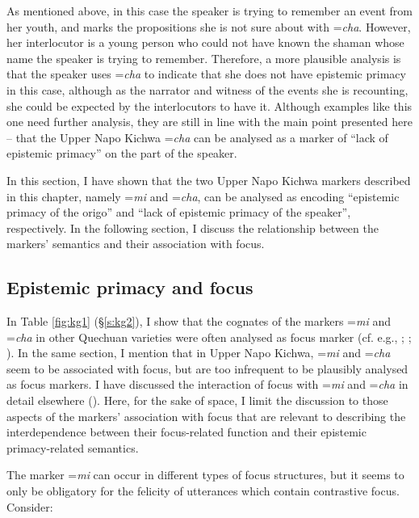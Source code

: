 \documentclass[output=paper]{langscibook}
\begin{document}
As mentioned above, in this case the speaker is trying to remember an event from her youth, and marks the propositions she is not sure about with =\textit{cha}. However, her interlocutor is a young person who could not have known the shaman whose name the speaker is trying to remember. Therefore, a more plausible analysis is that the speaker uses =\textit{cha} to indicate that she does not have epistemic primacy in this case, although as the narrator and witness of the events she is recounting, she could be expected by the interlocutors to have it. Although examples like this one need further analysis, they are still in line with the main point presented here – that the Upper Napo Kichwa =\textit{cha} can be analysed as a marker of “lack of epistemic primacy” on the part of the speaker.

In this section, I have shown that the two Upper Napo Kichwa markers described in this chapter, namely =\textit{mi} and =\textit{cha}, can be analysed as encoding “epistemic primacy of the origo” and “lack of epistemic primacy of the speaker”, respectively. In the following section, I discuss the relationship between the markers’ semantics and their association with focus. 


\subsection{Epistemic primacy and focus}\label{s:kg4-2}

In Table \ref{fig:kg1} (§\ref{s:kg2}), I show that the cognates of the markers =\textit{mi} and =\textit{cha} in other Quechuan  varieties were often analysed as focus marker (cf. e.g., \citealt{Muysken1995}; \citealt{Sanchez2010}; \citeyear{Sanchez2015}). In the same section, I mention that in Upper Napo Kichwa, =\textit{mi} and =\textit{cha} seem to be associated with focus, but are too infrequent to be plausibly analysed as focus markers. I have discussed the interaction of focus with =\textit{mi} and =\textit{cha} in detail elsewhere (\citealt[ch.4]{Grzech2016}). Here, for the sake of space, I limit the discussion to those aspects of the markers’ association with focus that are relevant to describing the interdependence between their focus-related function and their epistemic primacy-related semantics.
 
The marker =\textit{mi} can occur in different types of focus structures, but it seems to only be obligatory for the felicity of utterances which contain contrastive focus. Consider:  
\end{document}
